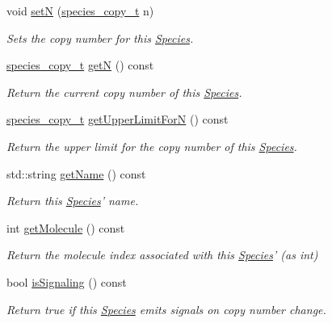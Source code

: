 \begin{DoxyCompactItemize}
void \hyperlink{classchem_1_1Species_af10a33a212fdb986fb93613e9c219f7a}{set\-N} (\hyperlink{common_8h_a3503f321fd36304ee274141275cca586}{species\-\_\-copy\-\_\-t} n)
\begin{DoxyCompactList}\small\item\em Sets the copy number for this \hyperlink{classchem_1_1Species}{Species}. \end{DoxyCompactList}\item 
\hyperlink{common_8h_a3503f321fd36304ee274141275cca586}{species\-\_\-copy\-\_\-t} \hyperlink{classchem_1_1Species_af7c9f51060b84169b428a7796dad6dca}{get\-N} () const 
\begin{DoxyCompactList}\small\item\em Return the current copy number of this \hyperlink{classchem_1_1Species}{Species}. \end{DoxyCompactList}\item 
\hyperlink{common_8h_a3503f321fd36304ee274141275cca586}{species\-\_\-copy\-\_\-t} \hyperlink{classchem_1_1Species_a05fbe0a05f028beb1bb729f19d44a56a}{get\-Upper\-Limit\-For\-N} () const 
\begin{DoxyCompactList}\small\item\em Return the upper limit for the copy number of this \hyperlink{classchem_1_1Species}{Species}. \end{DoxyCompactList}\item 
std\-::string \hyperlink{classchem_1_1Species_aa32c8f7fb344c68539a927c6a7f916c7}{get\-Name} () const 
\begin{DoxyCompactList}\small\item\em Return this \hyperlink{classchem_1_1Species}{Species}' name. \end{DoxyCompactList}\item 
int \hyperlink{classchem_1_1Species_a330ef4514a8979a6ea0e6f71ed5cb820}{get\-Molecule} () const 
\begin{DoxyCompactList}\small\item\em Return the molecule index associated with this \hyperlink{classchem_1_1Species}{Species}' (as int) \end{DoxyCompactList}\item 
bool \hyperlink{classchem_1_1Species_aa412f592e88600b48e3df591fc4cd655}{is\-Signaling} () const 
\begin{DoxyCompactList}\small\item\em Return true if this \hyperlink{classchem_1_1Species}{Species} emits signals on copy number change. \end{DoxyCompactList}\item 

\end{DoxyCompactItemize}
